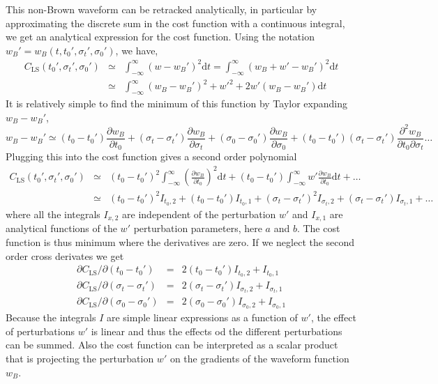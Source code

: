 This non-Brown waveform can be retracked analytically, in particular by approximating the discrete sum in the cost function with a continuous integral, we get an analytical expression for the cost function. Using the notation $w_B'=w_B(t,t_0',\sigma_t',\sigma_0')$, we have, 
\begin{eqnarray}
   C_{\mathrm{LS}}(t_0',\sigma_t',\sigma_0')& \simeq &\int_{-\infty} ^\infty \left( w-w_B'  \right)^2 \mathrm{d} t =\int_{-\infty} ^\infty \left( w_B+w'-w_B'  \right)^2 \mathrm{d} t \\
                  & \simeq & \int_{-\infty} ^\infty \left( w_B-w_B' \right)^2  + w'^2+ 2 w'\left( w_B-w_B' \right)  \mathrm{d} t 
\end{eqnarray} 
It is relatively simple to find the minimum of this function \citep{DeCarlo&al.2023} by Taylor expanding $w_B-w_B'$, 
\begin{equation}
    w_B-w_B' \simeq  (t_0-t_0') \frac{\partial w_B}{\partial t_0} +   (\sigma_t-\sigma_t') \frac{\partial w_B}{\partial \sigma_t} +   (\sigma_0-\sigma_0') \frac{\partial w_B}{\partial \sigma_0} + (t_0-t_0')(\sigma_t-\sigma_t') \frac{\partial^2 w_B}{\partial t_0  \partial \sigma_t}  \dots 
\end{equation}
Plugging this into the cost function gives a second order polynomial 
\begin{eqnarray}
   C_{\mathrm{LS}}(t_0',\sigma_t',\sigma_0')& \simeq & (t_0-t_0')^2 \int_{-\infty} ^\infty \left(\frac{\partial w_B}{\partial t_0}\right)^2 \mathrm{d} t + (t_0-t_0') \int_{-\infty} ^\infty w' \frac{\partial w_B}{\partial t_0} \mathrm{d} t   +  \dots \\
     & \simeq & (t_0-t_0')^2  I_{t_0,2} + (t_0-t_0') I_{t_0,1} +  (\sigma_t-\sigma_t')^2  I_{\sigma_t,2}  +  (\sigma_t-\sigma_t')  I_{\sigma_t,1} + \dots
\end{eqnarray} 
where all the integrals $I_{x,2}$ are independent of the perturbation $w'$ and   $I_{x,1}$ are analytical functions of the $w'$ perturbation parameters, here $a$ and $b$. The cost function is thus minimum where the derivatives are zero. If we neglect the second order cross derivates we get
\begin{eqnarray}
\partial C_{\mathrm{LS}} / \partial (t_0-t_0') &= & 2 (t_0-t_0')    I_{t_0,2} + I_{t_0,1}  \\
\partial C_{\mathrm{LS}} / \partial (\sigma_t-\sigma_t') &=&  2 (\sigma_t-\sigma_t')    I_{\sigma_t,2} + I_{\sigma_t,1}    \\
\partial C_{\mathrm{LS}} / \partial (\sigma_0-\sigma_0') &= & 2 (\sigma_0-\sigma_0')    I_{\sigma_0,2} + I_{\sigma_0,1}   
\end{eqnarray} 
Because the integrals $I$ are simple linear expressions as a function of $w'$, the effect of perturbations $w'$ is linear and thus the effects od the different perturbations can be summed.  Also the cost function can be interpreted as a scalar product that is projecting the perturbation $w'$ on the gradients of the waveform function $w_B$. 

